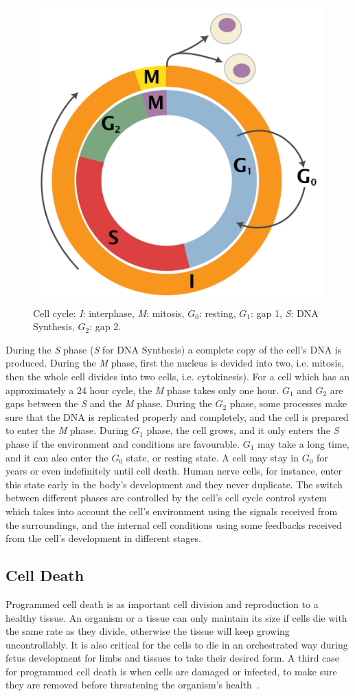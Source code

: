 \begin{figure}[!ht]
  \centering
  \includegraphics[width=.5\textwidth]{figs/background/470px-Cell_Cycle_2-2}
  \caption{Cell cycle: \emph{I}: interphase, \emph{M}: mitosis, \emph{$G_0$}: resting, \emph{$G_1$}: gap 1, \emph{S}: DNA Synthesis, \emph{$G_2$}: gap 2.\protect\footnotemark}
  \label{fig:bkg:cell-cycle}
\end{figure}

During the \emph{S} phase (\emph{S} for DNA Synthesis) a complete copy of the cell's DNA is produced. During the \emph{M} phase, first the nucleus is devided into two, i.e. mitosis, then the whole cell divides into two cells, i.e. cytokinesis). For a cell which has an approximately a 24 hour cycle, the \emph{M} phase takes only one hour. $G_1$ and $G_2$ are gaps between the \emph{S} and the \emph{M} phase. During the $G_2$ phase, some processes make sure that the DNA is replicated properly and completely, and the cell is prepared to enter the \emph{M} phase. During $G_1$ phase, the cell grows, and it only enters the \emph{S} phase if the environment and conditions are favourable. $G_1$ may take a long time, and it can also enter the $G_0$ state, or resting state. A cell may stay in $G_0$ for years or even indefinitely until cell death. Human nerve cells, for instance, enter this state early in the body's development and they never duplicate. The switch between different phases are controlled by the cell's cell cycle control system which takes into account the cell's environment using the signals received from the surroundings, and the internal cell conditions using some feedbacks received from the cell's development in different stages.

\subsection{Cell Death}
Programmed cell death is as important cell division and reproduction to a healthy tissue. An organism or a tissue can only maintain its size if cells die with the same rate as they divide, otherwise the tissue will keep growing uncontrollably. It is also critical for the cells to die in an orchestrated way during fetus development for limbs and tissues to take their desired form. A third case for programmed cell death is when cells are damaged or infected, to make sure they are removed before threatening the organism's health~\cite[Ch. 18]{the-cell}.

